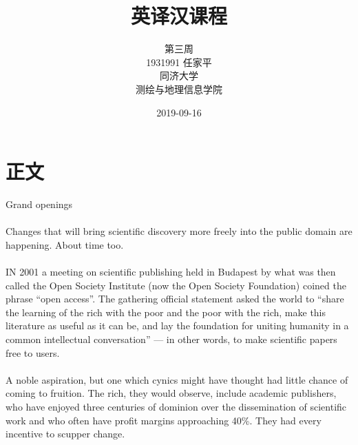 \documentclass[a4paper, 12pt, UTF8]{article}
\begin{document}
\title{\Huge 英译汉课程}
\author{\Large 
        第三周 \\[12pt]
        1931991 任家平 \\[12pt]
        同济大学 \\[12pt]
        测绘与地理信息学院}
\date{2019-09-16}
\maketitle

\thispagestyle{empty}

\newpage
{}
\tableofcontents
{}

\newpage
{}
\section{正文}
\begin{bfseries}
    \Large
    Grand openings
    \paragraph*{}
    \large
    Changes that will bring scientific discovery more freely into the public domain are happening. About time too.
\end{bfseries}

\paragraph*{}
    IN 2001 a meeting on scientific publishing held in Budapest by what was then called the Open Society Institute (now the Open Society Foundation) coined the phrase “open access”. The gathering official statement asked the world to “share the learning of the rich with the poor and the poor with the rich, make this literature as useful as it can be, and lay the foundation for uniting humanity in a common intellectual conversation” --- in other words, to make scientific papers free to users.

\paragraph*{}
    A noble aspiration, but one which cynics might have thought had little chance of coming to fruition. The rich, they would observe, include academic publishers, who have enjoyed three centuries of dominion over the dissemination of scientific work and who often have profit margins approaching 40\%. They had every incentive to scupper change.
\end{document}
